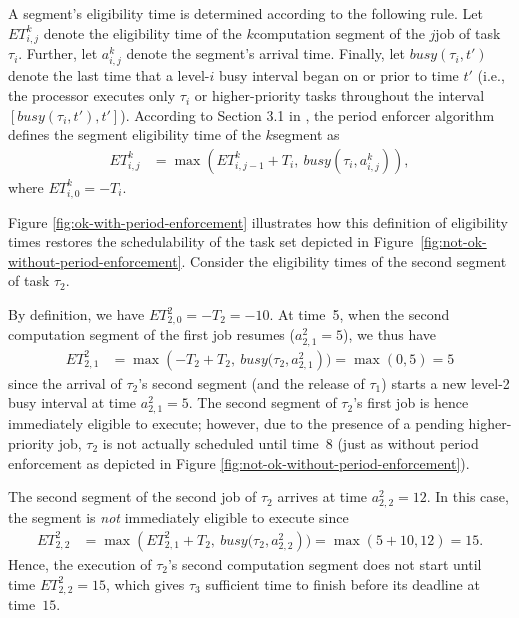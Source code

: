 A segment's eligibility time is determined according to the following rule. Let $ET_{i,j}^k$ denote the eligibility time of the $k$\xth computation segment of the $j$\xth job of task $\tau_i$. Further, let $a^k_{i,j}$ denote the segment's arrival time. Finally, let $\mathit{busy}(\tau_i, t')$ denote the last time that a level-$i$ busy interval began on or prior to time $t'$ (i.e., the processor executes only $\tau_i$ or higher-priority tasks throughout the interval $[\mathit{busy}(\tau_i, t'), t']$). According to Section 3.1 in \cite{Raj:suspension1991}, the period enforcer algorithm defines the segment eligibility time of the $k$\xth segment as
\begin{align}\label{eq:ET-def}
	ET_{i,j}^k & = \max\left(ET_{i,j-1}^k + T_i,\ \mathit{busy}(\tau_i, a^k_{i,j})\right),
\end{align}
where $ET_{i,0}^k = -T_i$. 

Figure \ref{fig:ok-with-period-enforcement} illustrates how this definition of eligibility times restores the schedulability of the task set depicted in Figure~\ref{fig:not-ok-without-period-enforcement}. Consider the eligibility times of the second segment of task $\tau_2$.

By definition, we have $ET_{2,0}^2 = -T_2 = -10$. At time~5, when the second computation segment of the first job resumes ($a_{2,1}^2 = 5$), we thus have
\begin{align*}
	ET_{2,1}^2 & = \max\left(-T_2 + T_2,\ \mathit{busy}(\tau_2, a_{2,1}^2\right) ) = \max(0, 5) = 5
\end{align*}
since the arrival of $\tau_2$'s second segment (and the release of $\tau_1$) starts a new level-2 busy interval at time $a_{2,1}^2 = 5$. The second segment of $\tau_2$'s first job is hence immediately eligible to execute; however, due to the presence of a pending higher-priority job, $\tau_2$ is not actually scheduled until time~8 (just as without period enforcement as depicted in Figure \ref{fig:not-ok-without-period-enforcement}).

The second segment of the second job of $\tau_2$ arrives at time $a_{2,2}^2 = 12$. In this case, the segment is \emph{not} immediately eligible to execute since
\begin{align*}
	ET_{2,2}^2 & = \max\left(ET_{2,1}^2 + T_2,\ \mathit{busy}(\tau_2, a_{2,2}^2\right) ) = \max(5 + 10, 12) = 15.
\end{align*}
Hence, the execution of $\tau_2$'s second computation segment does not start until time $ET_{2,2}^2 = 15$, which gives $\tau_3$ sufficient time to finish before its deadline at time~$15$.


